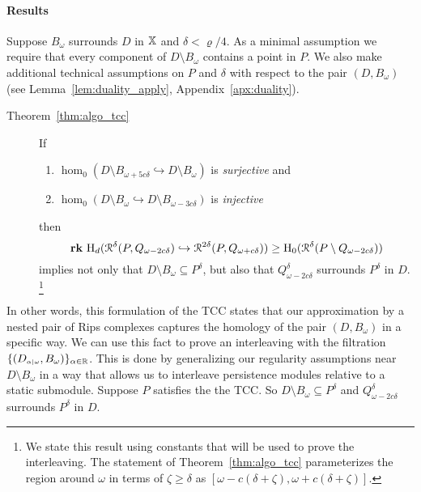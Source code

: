 \paragraph{Results}

Suppose $B_\omega$ surrounds $D$ in $\mathbb{X}$ and $\delta < \varrho / 4$.
As a minimal assumption we require that every component of $D\setminus B_\omega$ contains a point in $P$.
We also make additional technical assumptions on $P$ and $\delta$ with respect to the pair $(D, B_\omega)$ (see Lemma~\ref{lem:duality_apply}, Appendix~\ref{apx:duality}).

\begin{description}
  \item[Theorem~\ref{thm:algo_tcc}] If
    \begin{enumerate}
      \item $\hom_0(D\setminus B_{\omega+5c\delta}\hookrightarrow D\setminus B_\omega)$ is \emph{surjective} and
      \item $\hom_0(D\setminus B_\omega\hookrightarrow D\setminus B_{\omega-3c\delta})$ is \emph{injective}
    \end{enumerate}
    then
    \[ \mathbf{rk}~\mathrm{H}_d(\mathcal{R}^\delta(P, Q_{\omega - 2c\delta})\hookrightarrow \mathcal{R}^{2\delta}(P, Q_{\omega+c\delta}))\geq \mathrm{H}_0(\mathcal{R}^\delta(P\setminus Q_{\omega-2c\delta})) \]
    implies not only that $D\setminus B_\omega\subseteq P^\delta$, but also that $Q_{\omega-2c\delta}^\delta$ surrounds $P^\delta$ in $D$.
    \footnote{We state this result using constants that will be used to prove the interleaving.
      The statement of Theorem~\ref{thm:algo_tcc} parameterizes the region around $\omega$ in terms of $\zeta\geq\delta$ as $[\omega-c(\delta+\zeta),\omega+c(\delta+\zeta)]$.}
\end{description}

In other words, this formulation of the TCC states that our approximation by a nested pair of Rips complexes captures the homology of the pair $(D,B_\omega)$ in a specific way.
We can use this fact to prove an interleaving with the filtration $\{(D_{\scriptscriptstyle \alpha\mid \omega}, B_\omega)\}_{\alpha\in\mathbb{R}}$.
This is done by generalizing our regularity assumptions near $D\setminus B_\omega$ in a way that allows us to interleave persistence modules relative to a static submodule.
Suppose $P$ satisfies the the TCC.
So $D\setminus B_\omega\subseteq P^\delta$ and  $Q_{\omega-2c\delta}^\delta$ surrounds $P^\delta$ in $D$.

